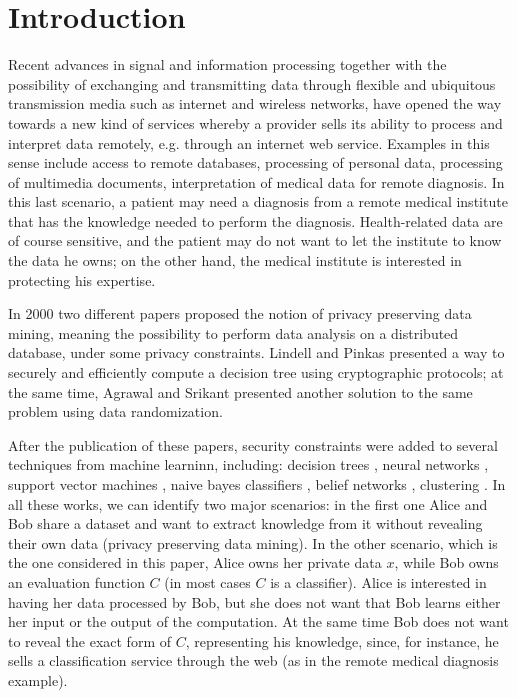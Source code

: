 \documentclass[11pt,oribibl,runningheads]{llncs}
\begin{document}
\section{Introduction}

Recent advances in signal and information processing together with
the possibility of exchanging and transmitting data through
flexible and ubiquitous transmission media such as internet and
wireless networks, have opened the way towards a new kind of
services whereby a provider sells its ability to process and
interpret data remotely, e.g. through an internet web service.
Examples in this sense include access to remote databases,
processing of personal data, processing of multimedia documents,
interpretation of medical data for remote diagnosis. In this last
scenario, a patient may need a diagnosis from a remote medical
institute that has the knowledge needed to perform the diagnosis.
Health-related data are of course sensitive, and the patient may
do not want to let the institute to know the data he owns; on the
other hand, the medical institute is interested in protecting his
expertise.

In 2000 two different papers proposed the notion of privacy
preserving data mining, meaning the possibility to perform data
analysis on a distributed database, under some privacy
constraints. Lindell and Pinkas \cite{PPDM-LindellPinkas}
presented a way to securely and efficiently compute a decision
tree using cryptographic protocols; at the same time, Agrawal and
Srikant \cite{PPDM-Agrawal} presented another solution to the same
problem using data randomization.

After the publication of these papers, security constraints were added to several techniques from
machine learninn, including: decision
trees \cite{PPDM-LindellPinkas}, neural networks
\cite{chang2005ope}, support vector machines \cite{lipmaa2006svm},
naive bayes classifiers \cite{kantarcioglu03privacy}, belief
networks \cite{yang2005bayesian,wright2004bayesian}, clustering
\cite{jha2005ppc}. In all these works, we can identify two major
scenarios: in the first one Alice and Bob share a dataset and want
to extract knowledge from it without revealing their own data
(privacy preserving data mining). In the other scenario, which is
the one considered in this paper, Alice owns her private data $x$,
while Bob owns an evaluation function $C$ (in most cases $C$ is a
classifier). Alice is interested in having her data processed by
Bob, but she does not want that Bob learns either her input or the
output of the computation. At the same time Bob does not want to
reveal the exact form of $C$, representing his knowledge, since,
for instance, he sells a classification service through the web
(as in the remote medical diagnosis example).
\end{document}

